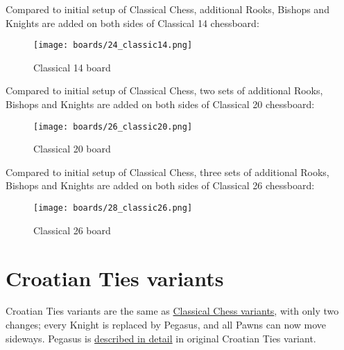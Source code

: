 Compared to initial setup of Classical Chess, additional Rooks, Bishops and Knights
are added on both sides of Classical 14 chessboard:

\noindent
\begin{figure}[h]
\texttt{[image: boards/24\_classic14.png]}
\caption{Classical 14 board}
\label{fig:24_classic14}
\end{figure}

\vfill{}

\clearpage %

Compared to initial setup of Classical Chess, two sets of additional Rooks, Bishops
and Knights are added on both sides of Classical 20 chessboard:

\noindent
\begin{figure}[h]
\texttt{[image: boards/26\_classic20.png]}
\caption{Classical 20 board}
\label{fig:26_classic20}
\end{figure}

\vfill{}

\clearpage %

Compared to initial setup of Classical Chess, three sets of additional Rooks, Bishops
and Knights are added on both sides of Classical 26 chessboard:

\noindent
\begin{figure}[h]
\texttt{[image: boards/28\_classic26.png]}
\caption{Classical 26 board}
\label{fig:28_classic26}
\end{figure}

\vfill{}

\clearpage %

\section*{Croatian Ties variants}
\label{sec:Simple variants/Croatian Ties variants}

Croatian Ties variants are the same as
\hyperref[sec:Simple variants/Classical Chess variants]{Classical Chess variants},
with only two changes; every Knight is replaced by Pegasus, and all Pawns can now
move sideways. Pegasus is \hyperref[sec:Croatian Ties/Pegasus]{described in detail}
in original Croatian Ties variant.

